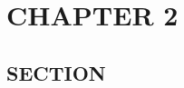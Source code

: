 \documentclass[../main/main]{subfiles}
\begin{document}
\chapter{CHAPTER 2}

\section{SECTION}

\printbibliography
\end{document}
